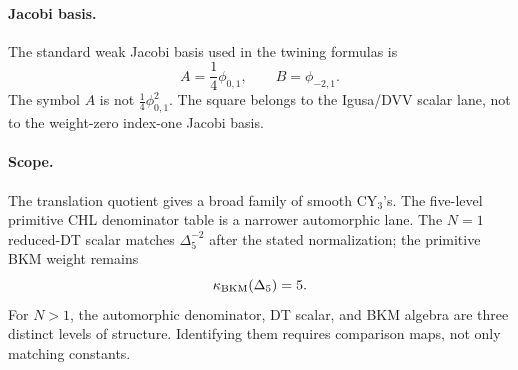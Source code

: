 \paragraph{Jacobi basis.}
The standard weak Jacobi basis used in the twining formulas is
\[
  A=\frac14\phi_{0,1},\qquad
  B=\phi_{-2,1}.
\]
The symbol \(A\) is not \(\frac14\phi_{0,1}^2\). The square belongs to
the Igusa/DVV scalar lane, not to the weight-zero index-one Jacobi
basis.

\paragraph{Scope.}
The translation quotient gives a broad family of smooth CY\(_3\)'s.
The five-level primitive CHL denominator table is a narrower
automorphic lane. The \(N=1\) reduced-DT scalar matches
\(\Delta_5^{-2}\) after the stated normalization; the primitive BKM
weight remains
\[
  \kappa_{\mathrm{BKM}}(\Delta_5)=5.
\]
For \(N>1\), the automorphic denominator, DT scalar, and BKM algebra
are three distinct levels of structure. Identifying them requires
comparison maps, not only matching constants.
